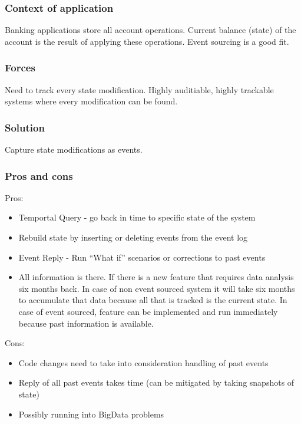 \documentclass[12pt, a4paper]{article}
\begin{document}
\subsubsection{Context of application}
Banking applications store all account operations. Current balance (state) of the account is the result of applying these operations. Event sourcing is a good fit.

\subsubsection{Forces}
Need to track every state modification. Highly auditiable, highly trackable systems where every modification can be found.

\subsubsection{Solution}
Capture state modifications as events.

\subsubsection{Pros and cons}

Pros:
\begin{itemize}
  \item Temportal Query - go back in time to specific state of the system
  \item Rebuild state by inserting or deleting events from the event log
  \item Event Reply - Run ``What if'' scenarios or corrections to past events
  \item All information is there. If there is a new feature that requires data analysis six months back. In case of non event sourced system it will take six months to accumulate that data because all that is tracked is the current state. In case of event sourced, feature can be implemented and run immediately because past information is available.
\end{itemize}

Cons:
\begin{itemize}
  \item Code changes need to take into consideration handling of past events
  \item Reply of all past events takes time (can be mitigated by taking snapshots of state)
  \item Possibly running into BigData problems
\end{itemize}
\end{document}
